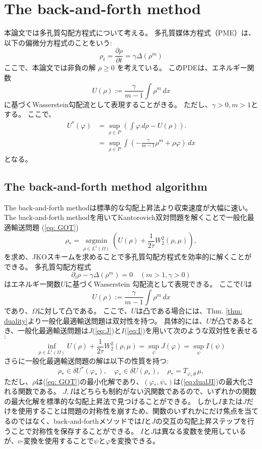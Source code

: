 \chapter{The back-and-forth method} 
\label{ch:The back-and-forth method}
本論文では多孔質勾配方程式について考える。
多孔質媒体方程式（PME）は、以下の偏微分方程式のことをいう$:$
\[
\rho_t = \frac{{\partial \rho}}{{\partial t}} = \gamma\Delta (\rho^m)
\]
ここで、本論文では非負の解 \(\rho \geq 0\) を考えている。
このPDEは、エネルギー関数
\[
    U(\rho) := \frac{\gamma}{{m-1}} \int \rho^m \, dx
\]
に基づくWasserstein勾配流として表現することがきる。
ただし、$\gamma > 0, m > 1$とする。
ここで、
\begin{align*}
    U^*(\varphi) &= \sup_{\rho \in P} \left( \int \varphi \, d\rho - U(\rho) \right).\\
                &= \sup_{\rho \in P} \int \left(- \frac{\gamma}{m-1}\rho^m + \rho\varphi\right) \, dx
\end{align*}
となる。

\section{The back-and-forth method algorithm}
\label{sect:The back-and-forth method algorithm}
The back-and-forth methodは標準的な勾配上昇法より収束速度が大幅に速い。
The back-and-forth methodを用いてKantorovich双対問題を解くことで一般化最適輸送問題
(\ref{eq: GOT})
\begin{equation*}
        \rho_* = \underset{\rho \in L^1(\Omega)} {\operatorname{argmin}} \left( U(\rho) + \frac{1}{2 \tau}W_2^2(\rho, \mu) \right), 
\end{equation*}
を求め、JKOスキームを求めることで多孔質勾配方程式を効率的に解くことができる。
多孔質勾配方程式
\[
    \partial_t \rho - \gamma\Delta(\rho^m) = 0  \quad(m > 1, \gamma > 0)
\]
はエネルギー関数$U$に基づくWasserstein 勾配流として表現できる。
ここで$U$は
\[
    U(\rho) := \frac{\gamma}{{m-1}} \int \rho^m \, dx
\]
であり、$\Omega$に対して凸である。
ここで、$U$は凸である場合には、Thm. \ref{thm: duality}より一般化最適輸送問題は双対性を持つ。
具体的には、$U$が凸であるとき、一般化最適輸送問題は$J$(\ref{eq:J})と$I$(\ref{eq:I})を用いて次のような双対性を表せる$:$
$$
    \inf_{\rho \in L^1(\Omega)} U(\rho) + \frac{1}{2 \tau} W^2_2(\rho, \mu) = \sup_\varphi J(\varphi) = \sup_\psi I (\psi)
$$
さらに一般化最適輸送問題の解は以下の性質を持つ$:$
\begin{equation}
    \label{eq:dualJI}
    \rho_* \in \delta U^*(\varphi_*), \quad \varphi_* \in \delta U(\rho_*), \quad \rho_* = T_{\varphi_* \#} \mu,
\end{equation}
ただし、$\rho$は(\ref{eq: GOT})の最小化解であり、$(\varphi_*, \psi_*)$は(\ref{eq:dualJI})の最大化される関数である。
$J, I$はどちらも制約がない汎関数であるので、いずれかの関数の最大化解を標準的な勾配上昇法で見つけることができる。
しかし$I$または$J$だけを使用することは問題の対称性を崩すため、関数のいずれかにだけ焦点を当てるのではなく、back-and-forthメソッドでは$I$と$J$の交互の勾配上昇ステップを行うことで対称性を保存することができる。
$I$と$J$は異なる変数を使用しているが、$c$-変換を使用することで$\psi$と$\varphi$を変換できる。


